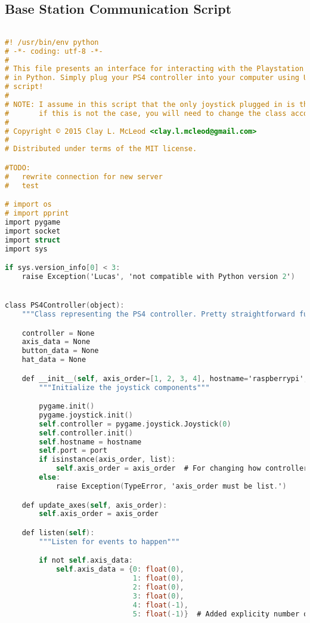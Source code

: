 \subsection{Base Station Communication Script}
\label{appendix:joystick}
\lstset{basicstyle=\tiny}
\begin{lstlisting}[language=C,caption= {Control Signal and Client Script},label={lst:ps4_controller.py}]

#! /usr/bin/env python
# -*- coding: utf-8 -*-
#
# This file presents an interface for interacting with the Playstation 4 Controller
# in Python. Simply plug your PS4 controller into your computer using USB and run this
# script!
#
# NOTE: I assume in this script that the only joystick plugged in is the PS4 controller.
#       if this is not the case, you will need to change the class accordingly.
#
# Copyright © 2015 Clay L. McLeod <clay.l.mcleod@gmail.com>
#
# Distributed under terms of the MIT license.

#TODO:
#   rewrite connection for new server
#   test

# import os
# import pprint
import pygame
import socket
import struct
import sys

if sys.version_info[0] < 3:
    raise Exception('Lucas', 'not compatible with Python version 2')


class PS4Controller(object):
    """Class representing the PS4 controller. Pretty straightforward functionality."""

    controller = None
    axis_data = None
    button_data = None
    hat_data = None

    def __init__(self, axis_order=[1, 2, 3, 4], hostname='raspberrypi', port=2222):
        """Initialize the joystick components"""

        pygame.init()
        pygame.joystick.init()
        self.controller = pygame.joystick.Joystick(0)
        self.controller.init()
        self.hostname = hostname
        self.port = port
        if isinstance(axis_order, list):
            self.axis_order = axis_order  # For changing how controller axes are bound
        else:
            raise Exception(TypeError, 'axis_order must be list.')

    def update_axes(self, axis_order):
        self.axis_order = axis_order

    def listen(self):
        """Listen for events to happen"""

        if not self.axis_data:
            self.axis_data = {0: float(0),
                              1: float(0),
                              2: float(0),
                              3: float(0),
                              4: float(-1),
                              5: float(-1)}  # Added explicity number of axes to avoid waiting for input


\end{lstlisting}
